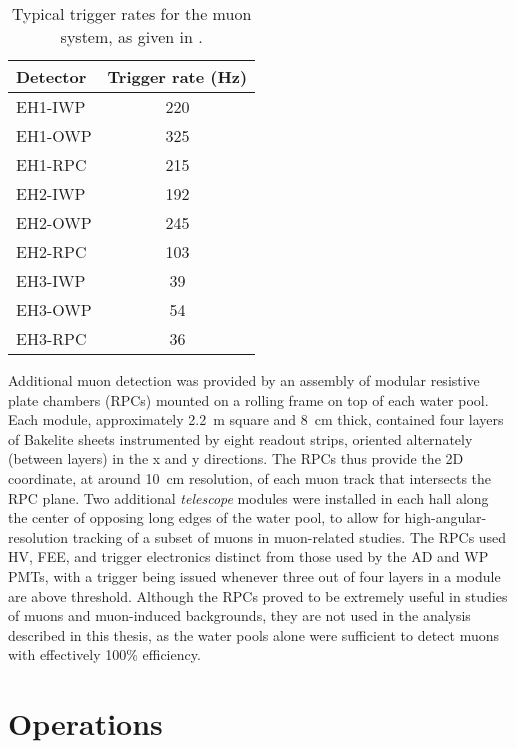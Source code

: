 \documentclass[../thesis.tex]{subfiles}
\begin{document}
\begin{table}[h]
  \begin{tabular}{lc}
    \toprule
    Detector & Trigger rate (Hz) \\
    \midrule
    EH1-IWP & 220 \\
    EH1-OWP & 325 \\
    EH1-RPC & 215 \\
    \midrule
    EH2-IWP & 192 \\
    EH2-OWP & 245 \\
    EH2-RPC & 103 \\
    \midrule
    EH3-IWP & 39 \\
    EH3-OWP & 54 \\
    EH3-RPC & 36 \\
    \bottomrule
  \end{tabular}
  \caption{Typical trigger rates for the muon system, as given in \cite{AN2016133}.}
  \label{tab:wpTriggerRates}
\end{table}

Additional muon detection was provided by an assembly of modular resistive plate chambers (RPCs) mounted on a rolling frame on top of each water pool. Each module, approximately 2.2~m square and 8~cm thick, contained four layers of Bakelite sheets instrumented by eight readout strips, oriented alternately (between layers) in the x and y directions. The RPCs thus provide the 2D coordinate, at around 10~cm resolution, of each muon track that intersects the RPC plane. Two additional \emph{telescope} modules were installed in each hall along the center of opposing long edges of the water pool, to allow for high-angular-resolution tracking of a subset of muons in muon-related studies. The RPCs used HV, FEE, and trigger electronics distinct from those used by the AD and WP PMTs, with a trigger being issued whenever three out of four layers in a module are above threshold. Although the RPCs proved to be extremely useful in studies of muons and muon-induced backgrounds, they are not used in the analysis described in this thesis, as the water pools alone were sufficient to detect muons with effectively 100\% efficiency.

\section{Operations}
\label{sec:expOperations}
\end{document}
